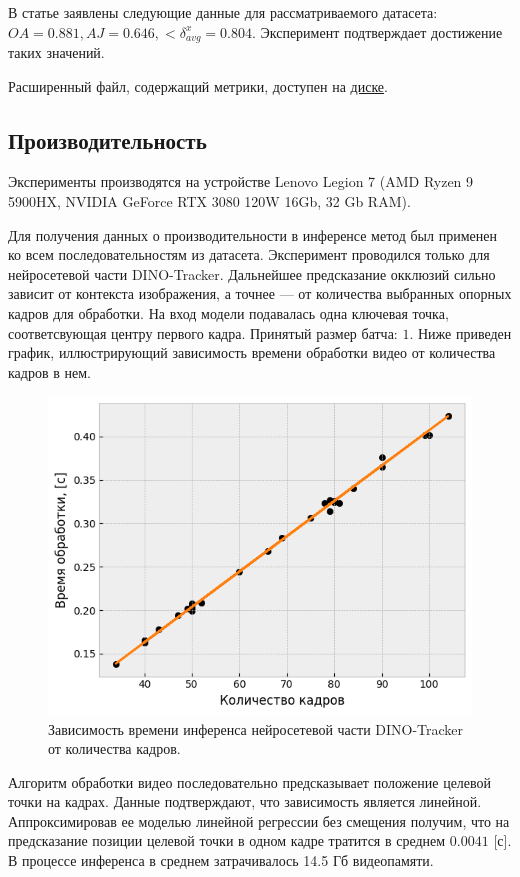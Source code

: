 \documentclass[a4paper, 14pt]{extarticle}
\theoremstyle{definition}
\theoremstyle{plain}
\theoremstyle{remark}
\begin{document}
В статье заявлены следующие данные для рассматриваемого датасета:
$OA=0.881, AJ=0.646, <\delta^x_{avg}=0.804$. Эксперимент подтверждает достижение таких значений.

Расширенный файл, содержащий метрики, доступен на \href{https://drive.google.com/file/d/1NcQksZNBh9HBexJbsNAwEITHeBhoiuUi/view?usp=drive_link}{диске}.
\subsection{Производительность}
Эксперименты производятся на устройстве Lenovo Legion 7 (AMD Ryzen 9 5900HX, NVIDIA GeForce RTX 3080 120W 16Gb, 32 Gb RAM).

Для получения данных о производительности в инференсе метод был применен ко всем последовательностям из датасета. Эксперимент проводился только для нейросетевой части DINO-Tracker. Дальнейшее предсказание окклюзий сильно зависит от контекста изображения, а точнее --- от количества выбранных опорных кадров для обработки.
На вход модели подавалась одна ключевая точка, соответсвующая центру первого кадра. Принятый размер батча: $1$.
Ниже приведен график, иллюстрирующий зависимость времени обработки видео от количества кадров в нем. 
\begin{figure}
    [H]
    \centering
    \includegraphics[width=\textwidth]{figs/performance.png}
    \caption{Зависимость времени инференса нейросетевой части DINO-Tracker от количества кадров.}
    \label{fig:performance}
\end{figure}

Алгоритм обработки видео последовательно предсказывает положение целевой точки на кадрах. Данные подтверждают, что зависимость является линейной. Аппроксимировав ее моделью линейной регрессии без смещения получим, что на предсказание позиции целевой точки в одном кадре тратится в среднем $0.0041$ [с]. В процессе инференса в среднем затрачивалось 14.5 Гб видеопамяти.
\end{document}
